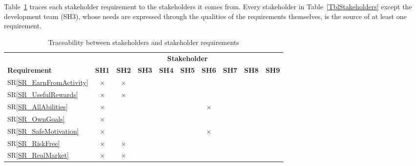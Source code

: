 \documentclass[12pt]{article}
\newcommand{\srref}[1]{SR\ref{#1}}
\begin{document}
Table~\ref{TblSHtoSR} traces each stakeholder requirement to the stakeholders
it comes from. Every stakeholder in Table~\ref{TblStakeholders} except the
development team (SH3), whose needs are expressed through the qualities of the
requirements themselves, is the source of at least one requirement.

\begin{table}[H]
  \caption{Traceability between stakeholders and stakeholder requirements}
  \label{TblSHtoSR}
  \small
  \centering
  \begin{tabular}{l*{9}{c}}
    \toprule
                                   & \multicolumn{9}{c}{\textbf{Stakeholder}}                                                                                                                         \\
    \cmidrule(l){2-10}
    \textbf{Requirement}           & \textbf{SH1}                             & \textbf{SH2} & \textbf{SH3} & \textbf{SH4} & \textbf{SH5} & \textbf{SH6} & \textbf{SH7} & \textbf{SH8} & \textbf{SH9} \\
    \midrule
    \srref{SR_EarnFromActivity}    & $\times$                                 & $\times$     &              &              &              &              &              &              &              \\
    \srref{SR_UsefulRewards}       & $\times$                                 & $\times$     &              &              &              &              &              &              &              \\
    \srref{SR_AllAbilities}        & $\times$                                 &              &              &              &              & $\times$     &              &              &              \\
    \srref{SR_OwnGoals}            & $\times$                                 &              &              &              &              &              &              &              &              \\
    \srref{SR_SafeMotivation}      & $\times$                                 &              &              &              &              & $\times$     &              &              &              \\
    \srref{SR_RiskFree}            & $\times$                                 & $\times$     &              &              &              &              &              &              &              \\
    \srref{SR_RealMarket}          & $\times$                                 & $\times$     &              &              &              &              &              &              &              \\

\end{tabular}
\end{table}
\end{document}
